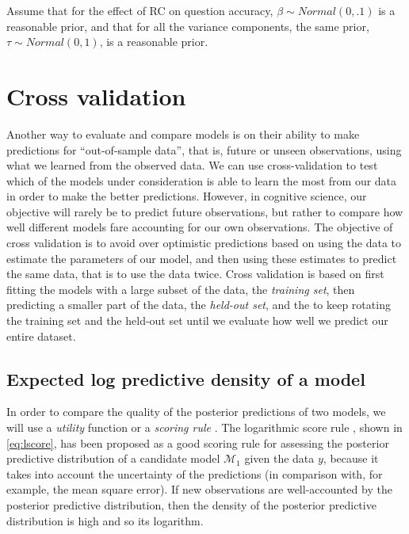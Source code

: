 \documentclass[12pt,]{krantz}
\theoremstyle{definition}
\theoremstyle{definition}
\theoremstyle{definition}
\theoremstyle{remark}
\begin{document}
Assume that for the effect of RC on question accuracy,
\(\beta \sim Normal(0, .1)\) is a reasonable prior, and that for all the
variance components, the same prior, \(\tau \sim Normal(0, 1)\), is a
reasonable prior.

\chapter{Cross validation}\label{ch:cv}

Another way to evaluate and compare models is on their ability to make
predictions for ``out-of-sample data'', that is, future or unseen
observations, using what we learned from the observed data. We can use
cross-validation to test which of the models under consideration is able
to learn the most from our data in order to make the better predictions.
However, in cognitive science, our objective will rarely be to predict
future observations, but rather to compare how well different models
fare accounting for our own observations. The objective of cross
validation is to avoid over optimistic predictions based on using the
data to estimate the parameters of our model, and then using these
estimates to predict the same data, that is to use the data twice. Cross
validation is based on first fitting the models with a large subset of
the data, the \emph{training set}, then predicting a smaller part of the
data, the \emph{held-out set}, and the to keep rotating the training set
and the held-out set until we evaluate how well we predict our entire
dataset.

\section{Expected log predictive density of a
model}\label{expected-log-predictive-density-of-a-model}

In order to compare the quality of the posterior predictions of two
models, we will use a \emph{utility} function or a \emph{scoring rule}
\citep[see][ for a review on scoring rules]{GneitingRaftery2007}. The
logarithmic score rule \citep{Good1952}, shown in \eqref{eq:lscore}, has
been proposed as a good scoring rule for assessing the posterior
predictive distribution of a candidate model \(\mathcal{M}_1\) given the
data \(y\), because it takes into account the uncertainty of the
predictions (in comparison with, for example, the mean square error). If
new observations are well-accounted by the posterior predictive
distribution, then the density of the posterior predictive distribution
is high and so its logarithm.
\end{document}
